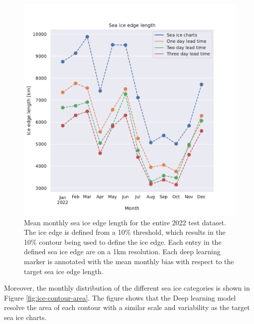 \documentclass[../main/thesis.tex]{subfiles}
\begin{document}
\begin{figure}
    \centering
    \includegraphics[width=\textwidth]{ice_edge_length}
    \caption{\label{fig:ice-edge-length}Mean monthly sea ice edge length for the entire 2022 test dataset. The ice edge is defined from a 10\% threshold, which results in the 10\% contour being used to define the ice edge. Each entry in the defined sea ice edge are on a 1km resolution. Each deep learning marker is annotated with the mean monthly bias with respect to the target sea ice edge length.}
\end{figure}

Moreover, the monthly distribution of the different sea ice categories is shown in Figure \ref{fig:ice-contour-area}. The figure shows that the Deep learning model resolve the area of each contour with a similar scale and variability as the target sea ice charts. 
\end{document}
